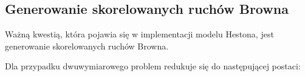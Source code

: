 \documentclass{pracamgr}
\begin{document}






 




\subsection{Generowanie skorelowanych ruchów Browna}
\label{sec:genRB}

Ważną kwestią, która pojawia się w implementacji modelu Hestona, jest generowanie skorelowanych 
ruchów Browna.

Dla przypadku dwuwymiarowego problem redukuje się do 
następującej postaci:
\end{document}
